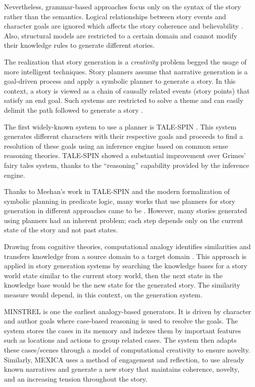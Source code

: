 Nevertheless, grammar-based approaches focus only on the syntax of the story rather than the semantics. Logical relationships between story events and character goals are ignored which affects the story coherence and believability \citep{alhussain2021automatic}. Also, structural models are restricted to a certain domain and cannot modify their knowledge rules to generate different stories.

The realization that story generation is a \textit{creativity} problem begged the usage of more intelligent techniques. Story planners assume that narrative generation is a goal-driven process and apply a symbolic planner to generate a story. In this context, a story is viewed as a chain of causally related events (story points) that satisfy an end goal. Such systems are restricted to solve a theme and can easily delimit the path followed to generate a story \citep{herrera2020automatic}.

The first widely-known system to use a planner is TALE-SPIN \citep{meehan1977tale}. This system generates different characters with their respective goals and proceeds to find a resolution of these goals using an inference engine based on common sense reasoning theories. TALE-SPIN showed a substantial improvement over Grimes' fairy tales system, thanks to the ``reasoning'' capability provided by the inference engine.

Thanks to Meehan's work in TALE-SPIN and the modern formalization of symbolic planning in predicate logic, many works that use planners for story generation in different approaches came to be \citep{dehn1981story, lebowitz1984creating, lebowitz1985story, cavazza2002character, porteous2009controlling, riedl2010narrative}. However, many stories generated using planners had an inherent problem; each step depends only on the current state of the story and not past states.

Drawing from cognitive theories, computational analogy identifies similarities and transfers knowledge from a source domain to a target domain \citep{zhu2013shall}. This approach is applied in story generation systems by searching the knowledge bases for a story world state similar to the current story world, then the next state in the knowledge base would be the new state for the generated story. The similarity measure would depend, in this context, on the generation system.

MINSTREL \citep{turner1993minstrel} is one the earliest analogy-based generators. It is driven by character and author goals where case-based reasoning is used to resolve the goals. The system stores the cases in its memory and indexes them by important features such as locations and actions to group related cases. The system then adapts these cases/scenes through a model of computational creativity to ensure novelty. Similarly, MEXICA \citep{perez2001mexica} uses a method of engagement and reflection, to use already known narratives and generate a new story that maintains coherence, novelty, and an increasing tension throughout the story.

